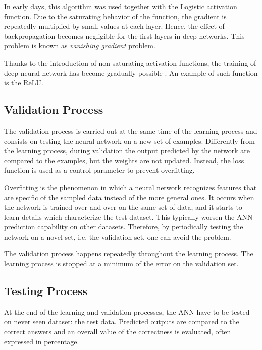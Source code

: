 In early days, this algorithm was used together with the Logistic activation function.
Due to the saturating behavior of the function, the gradient is repeatedly multiplied by small values at each layer.
Hence, the effect of backpropagation becomes negligible for the first layers in deep networks.
This problem is known as \textit{vanishing gradient} problem.

Thanks to the introduction of non saturating activation functions, the training of deep neural network has become gradually possible \cite{krizhevsky2012imagenet}.
An example of such function is the \acf{ReLU}.


\subsection{Validation Process}
\label{ssec:Validation_Process}
The validation process is carried out at the same time of the learning process and consists on testing the neural network on a new set of examples.
Differently from the learning process, during validation the output predicted by the network are compared to the examples, but the weights are not updated.
Instead, the loss function is used as a control parameter to prevent overfitting.

Overfitting is the phenomenon in which a neural network recognizes features that are specific of the sampled data instead of the more general ones.
It occurs when the network is trained over and over on the same set of data, and it starts to learn details which characterize the test dataset.
This typically worsen the \acs{ANN} prediction capability on other datasets.
Therefore, by periodically testing the network on a novel set, i.e. the validation set, one can avoid the problem.

The validation process happens repeatedly throughout the learning process. %
The learning process is stopped at a minimum of the error on the validation set.

\subsection{Testing Process}
\label{ssec:Testing_Process}
At the end of the learning and validation processes, the ANN have to be tested on never seen dataset: the test data.
Predicted outputs are compared to the correct answers and an overall value of the correctness is evaluated, often expressed in percentage.

